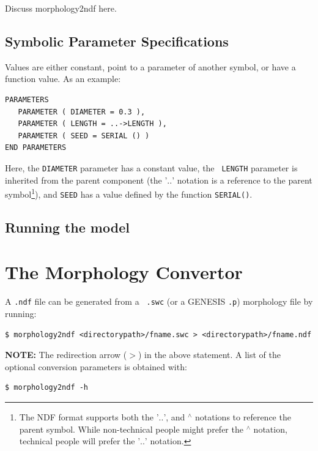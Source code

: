 \documentclass[12pt]{article}
\begin{document}
Discuss morphology2ndf here.

\subsection{Symbolic Parameter Specifications}

Values are either constant, point to a parameter of another symbol,
or have a function value.  As an example:

\begin{verbatim}
PARAMETERS
   PARAMETER ( DIAMETER = 0.3 ),
   PARAMETER ( LENGTH = ..->LENGTH ),
   PARAMETER ( SEED = SERIAL () )
END PARAMETERS
\end{verbatim}

Here, the {\tt DIAMETER} parameter has a constant value, the {\tt
LENGTH} parameter is inherited from the parent component (the
'$..$' notation is a reference to the parent symbol\footnote{The NDF
format supports both the '$..$', and $^\wedge$ notations to
reference the parent symbol.  While non-technical people might
prefer the $^\wedge$ notation,
technical people will prefer the '$..$' notation.}),
and {\tt SEED} has a value defined by the function {\tt SERIAL()}.

\subsection{Running the model}

\section{The Morphology Convertor}
\label{sec:morph-conv-conf}

A {\tt .ndf} file can be generated from a {\tt
  .swc} (or a GENESIS {\tt .p}) morphology file by running:

\begin{verbatim}
$ morphology2ndf <directorypath>/fname.swc > <directorypath>/fname.ndf
\end{verbatim}
{\bf NOTE:} The redirection arrow ($>$) in the above statement. A list of the
optional conversion parameters is obtained with:

\begin{verbatim}
$ morphology2ndf -h
\end{verbatim}
\end{document}
